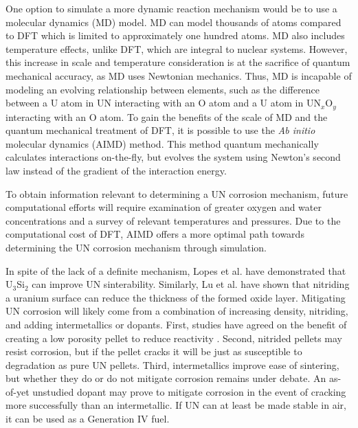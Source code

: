 \documentclass[11pt]{article}
\begin{document}
\begin{multicols}{2}
One option to simulate a more dynamic reaction mechanism would be to use a molecular dynamics (MD) model. MD can model thousands of atoms compared to DFT which is limited to approximately one hundred atoms. MD also includes temperature effects, unlike DFT, which are integral to nuclear systems. However, this increase in scale and temperature consideration is at the sacrifice of quantum mechanical accuracy, as MD uses Newtonian mechanics. Thus, MD is incapable of modeling an evolving relationship between elements, such as the difference between a U atom in UN interacting with an O atom and a U atom in UN$_{x}$O$_{y}$ interacting with an O atom. To gain the benefits of the scale of MD and the quantum mechanical treatment of DFT, it is possible to use the \textit{Ab initio} molecular dynamics (AIMD) method. This method quantum mechanically calculates interactions on-the-fly, but evolves the system using Newton's second law instead of the gradient of the interaction energy. 
\par 
To obtain information relevant to determining a UN corrosion mechanism, future computational efforts will require examination of greater oxygen and water concentrations and a survey of relevant temperatures and pressures. Due to the computational cost of DFT, AIMD offers a more optimal path towards determining the UN corrosion mechanism through simulation.
\par In spite of the lack of a definite mechanism, Lopes et al. \cite{Lopes2017} have demonstrated that U$_{3}$Si$_{2}$ can improve UN sinterability. Similarly, Lu et al. \cite{Lu2016} have shown that nitriding a uranium surface can reduce the thickness of the formed oxide layer.
Mitigating UN corrosion will likely come from a combination of increasing density, nitriding, and adding intermetallics or dopants. First, studies have agreed on the benefit of creating a low porosity pellet to reduce reactivity \cite{Lopes2017,Johnson2016,Jolkkonen2017}. Second, nitrided pellets may resist corrosion, but if the pellet cracks it will be just as susceptible to degradation as pure UN pellets. Third, intermetallics improve ease of sintering, but whether they do or do not mitigate corrosion remains under debate. An as-of-yet unstudied dopant may prove to mitigate corrosion in the event of cracking more successfully than an intermetallic. If UN can at least be made stable in air, it can be used as a Generation IV fuel.

\end{multicols}
\end{document}
